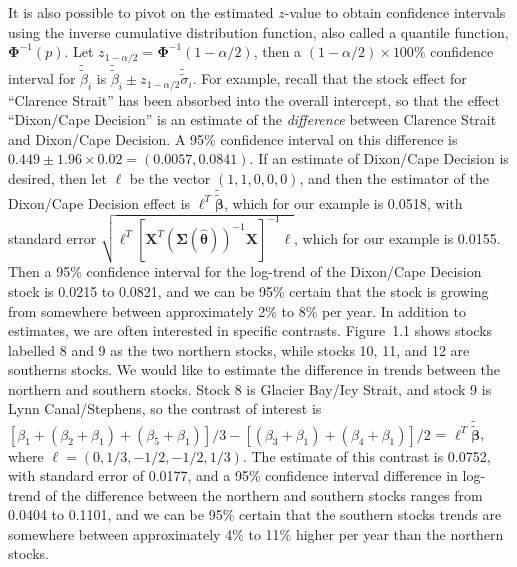 \documentclass[12pt, titlepage]{article}
\begin{document}
It is also possible to pivot on the estimated $z$-value to obtain confidence intervals using the inverse cumulative distribution function, also called a quantile function, $\boldsymbol{\Phi}^{-1}(p)$. Let $z_{1-\alpha/2} = \boldsymbol{\Phi}^{-1}(1-\alpha/2)$, then a $(1-\alpha/2)\times100\%$ confidence interval for $\tilde{\tilde{\beta}}_{i}$ is $\tilde{\tilde{\beta}}_{i} \pm z_{1-\alpha/2}\tilde{\tilde{\sigma}}_{i}$.  For example, recall that the stock effect for ``Clarence Strait'' has been absorbed into the overall intercept, so that the effect ``Dixon/Cape Decision'' is an estimate of the \textit{difference} between Clarence Strait and Dixon/Cape Decision.  A 95\% confidence interval on this difference is $0.449 \pm 1.96 \times 0.02 = (0.0057, 0.0841)$. If an estimate of Dixon/Cape Decision is desired, then let $\boldsymbol{\ell}$ be the vector $(1, 1, 0, 0, 0)$, and then the estimator of the Dixon/Cape Decision effect is $\boldsymbol{\ell}^{T}\tilde{\tilde{\boldsymbol{\beta}}}$, which for our example is 0.0518, with standard error $\sqrt{\boldsymbol{\ell}^{T}[\mathbf{X}^{T}(\boldsymbol{\Sigma}(\hat{\boldsymbol{\theta}}))^{-1}\mathbf{X}]^{-1}\boldsymbol{\ell}}$, which for our example is 0.0155.  Then a 95\% confidence interval for the log-trend of the  Dixon/Cape Decision stock is 0.0215 to 0.0821, and we can be 95\% certain that the stock is growing from somewhere between approximately 2\% to 8\% per year.  In addition to estimates, we are often interested in specific contrasts. Figure~1.1 shows stocks labelled 8 and 9 as the two northern stocks, while stocks 10, 11, and 12 are southerns stocks.  We would like to estimate the difference in trends between the northern and southern stocks.  Stock 8 is Glacier Bay/Icy Strait, and stock 9 is Lynn Canal/Stephens, so the contrast of interest is $[\beta_{1} + (\beta_{2} + \beta_{1}) + (\beta_{5} + \beta_{1})]/3 - [(\beta_{3} + \beta_{1}) + (\beta_{4} + \beta_{1})]/2$ = $\boldsymbol{\ell}^{T}\tilde{\tilde{\boldsymbol{\beta}}}$, where $\boldsymbol{\ell} = (0, 1/3, -1/2, -1/2, 1/3)$. The estimate of this contrast is 0.0752, with standard error of 0.0177, and a 95\% confidence interval difference in log-trend of the difference between the northern and southern stocks ranges from 0.0404 to 0.1101, and we can be 95\% certain that the southern stocks trends are somewhere between approximately 4\% to 11\% higher per year than the northern stocks.
\end{document}
